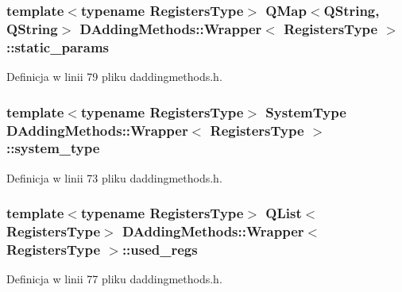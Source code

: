 \hypertarget{class_d_adding_methods_1_1_wrapper_a915ee3066596bebdc8f2c21c6cf5b9bc}{
\subsubsection[{static\-\_\-params}]{\setlength{\rightskip}{0pt plus 5cm}template$<$typename Registers\-Type$>$ Q\-Map$<$Q\-String, Q\-String$>$ {\bf D\-Adding\-Methods\-::\-Wrapper}$<$ Registers\-Type $>$\-::static\-\_\-params}}\label{class_d_adding_methods_1_1_wrapper_a915ee3066596bebdc8f2c21c6cf5b9bc}


Definicja w linii 79 pliku daddingmethods.\-h.

\hypertarget{class_d_adding_methods_1_1_wrapper_ae298975da4ef638bef00c8277501eddc}{
\subsubsection[{system\-\_\-type}]{\setlength{\rightskip}{0pt plus 5cm}template$<$typename Registers\-Type$>$ {\bf System\-Type} {\bf D\-Adding\-Methods\-::\-Wrapper}$<$ Registers\-Type $>$\-::system\-\_\-type}}\label{class_d_adding_methods_1_1_wrapper_ae298975da4ef638bef00c8277501eddc}


Definicja w linii 73 pliku daddingmethods.\-h.

\hypertarget{class_d_adding_methods_1_1_wrapper_aba0dc1a5f9addd4317b87e92fb2eb0db}{
\subsubsection[{used\-\_\-regs}]{\setlength{\rightskip}{0pt plus 5cm}template$<$typename Registers\-Type$>$ Q\-List$<$Registers\-Type$>$ {\bf D\-Adding\-Methods\-::\-Wrapper}$<$ Registers\-Type $>$\-::used\-\_\-regs}}\label{class_d_adding_methods_1_1_wrapper_aba0dc1a5f9addd4317b87e92fb2eb0db}


Definicja w linii 77 pliku daddingmethods.\-h.

